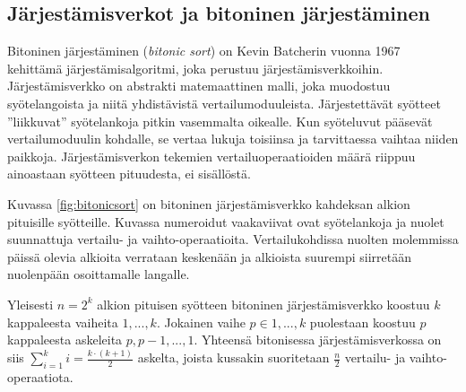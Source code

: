 \documentclass[a4paper,11pt]{article}
\newcommand{\engl}[1]{\foreignlanguage{english}{\em #1}}
\begin{document}
\subsection{Järjestämisverkot ja bitoninen järjestäminen}

Bitoninen järjestäminen (\engl{bitonic sort}) on Kevin Batcherin vuonna 1967 kehittämä järjestämisalgoritmi, joka perustuu järjestämisverkkoihin. Järjestämisverkko on abstrakti matemaattinen malli, joka muodostuu syötelangoista ja niitä yhdistävistä vertailumoduuleista. Järjestettävät syötteet ''liikkuvat'' syötelankoja pitkin vasemmalta oikealle. Kun syöteluvut pääsevät vertailumoduulin kohdalle, se vertaa lukuja toisiinsa ja tarvittaessa vaihtaa niiden paikkoja. Järjestämisverkon tekemien vertailuoperaatioiden määrä riippuu ainoastaan syötteen pituudesta, ei sisällöstä.



Kuvassa \ref{fig:bitonicsort} on bitoninen järjestämisverkko kahdeksan alkion pituisille syötteille. Kuvassa numeroidut vaakaviivat ovat syötelankoja ja nuolet suunnattuja vertailu- ja vaihto-operaatioita. Vertailukohdissa nuolten molemmissa päissä olevia alkioita verrataan keskenään ja alkioista suurempi siirretään nuolenpään osoittamalle langalle.

Yleisesti $n = 2^k$ alkion pituisen syötteen bitoninen järjestämisverkko koostuu $k$ kappaleesta vaiheita $1,...,k$. Jokainen vaihe $p \in 1,...,k$ puolestaan koostuu $p$ kappaleesta askeleita $p, p-1, ..., 1$. Yhteensä bitonisessa järjestämisverkossa on siis $\sum_{i = 1}^k i = \frac{k \cdot (k + 1)}{2}$ askelta, joista kussakin suoritetaan $\frac{n}{2}$ vertailu- ja vaihto-o\-pe\-raa\-ti\-o\-ta.
\end{document}
